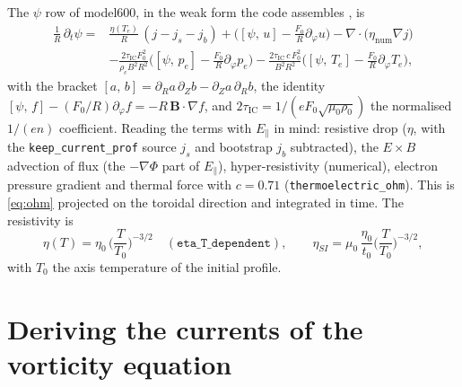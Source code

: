 \documentclass[11pt,a4paper]{article}
\newcommand{\bB}{\mathbf{B}}
\newcommand{\divg}{\nabla\!\cdot\!}
\newcommand{\Te}{T_e}
\newcommand{\pb}[2]{\left[#1,\,#2\right]}
\newcommand{\code}[1]{\texttt{#1}}
\newcommand{\tauic}{\tau_{\mathrm{IC}}}
\begin{document}
The $\psi$ row of model600, in the weak form the code assembles \cite{ohmnote}, is
\begin{equation}
\begin{aligned}
  \frac{1}{R}\,\partial_t\psi = {}& \frac{\eta(\Te)}{R}\,(j - j_s - j_b)
  + \Big(\pb{\psi}{u} - \frac{F_0}{R}\partial_\varphi u\Big)
  - \divg\big(\eta_{\mathrm{num}}\nabla j\big) \\
  & - \frac{2\tauic F_0^2}{\rho_c B^2 R^2}\Big(\pb{\psi}{p_e} - \frac{F_0}{R}\partial_\varphi p_e\Big)
  - \frac{2\tauic\,c\,F_0^2}{B^2R^2}\Big(\pb{\psi}{\Te} - \frac{F_0}{R}\partial_\varphi\Te\Big),
\end{aligned}
\label{eq:jorekohm}
\end{equation}
with the bracket $\pb{a}{b} = \partial_R a\,\partial_Z b - \partial_Z a\,\partial_R b$, the identity
$\pb{\psi}{f} - (F_0/R)\partial_\varphi f = -R\,\bB\cdot\nabla f$, and $2\tauic = 1/(e F_0\sqrt{\mu_0\rho_0})$ the
normalised $1/(en)$ coefficient. Reading the terms with $E_\parallel$ in mind: resistive drop ($\eta$, with the
\code{keep\_current\_prof} source $j_s$ and bootstrap $j_b$ subtracted), the $E\times B$ advection of flux (the
$-\nabla\Phi$ part of $E_\parallel$), hyper-resistivity (numerical), electron pressure gradient and thermal force with
$c = 0.71$ (\code{thermoelectric\_ohm}). This is \eqref{eq:ohm} projected on the toroidal direction and integrated in
time. The resistivity is
\begin{equation}
  \eta(T) = \eta_0\,\Big(\frac{T}{T_0}\Big)^{-3/2}\quad(\code{eta\_T\_dependent}),\qquad
  \eta_{SI} = \mu_0\,\frac{\eta_0}{t_0}\Big(\frac{T}{T_0}\Big)^{-3/2},
  \label{eq:joreketa}
\end{equation}
with $T_0$ the axis temperature of the initial profile.

\section{Deriving the currents of the vorticity equation}
\label{sec:vort}
\end{document}
